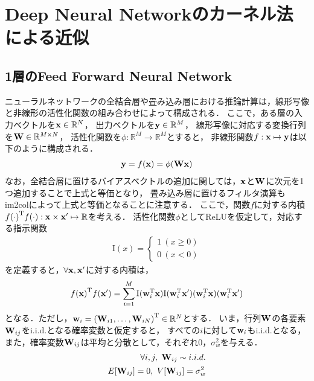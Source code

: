 \documentclass[11pt,a4j]{jarticle}
\begin{document}
  \section{Deep Neural Networkのカーネル法による近似}
    \subsection{1層のFeed Forward Neural Network}
      ニューラルネットワークの全結合層や畳み込み層における推論計算は，線形写像と非線形の活性化関数の組み合わせによって構成される．
      ここで，ある層の入力ベクトルを${\bf x} \in \mathbb{R}^{N}$，
      出力ベクトルを${\bf y} \in \mathbb{R}^{M}$，
      線形写像に対応する変換行列を${\bf W} \in \mathbb{R}^{M \times N}$，
      活性化関数を$\phi: \mathbb{R}^{M} \to \mathbb{R}^{M}$とすると，
      非線形関数$f:{\bf x} \mapsto {\bf y}$は以下のように構成される．
      \begin{align}
        {\bf y} = f({\bf x}) = \phi( {\bf W x} )
      \end{align}
      なお，全結合層に置けるバイアスベクトルの追加に関しては，$\bf x$と$\bf W$に次元を1つ追加することで上式と等価となり，
      畳み込み層に置けるフィルタ演算もim2colによって上式と等価となることに注意する．
      ここで，関数$f$に対する内積${f(\cdot)}^{\mathrm{T}}f(\cdot): {\bf x} \times {\bf x}' \mapsto \mathbb{R}$を考える．
      活性化関数$\phi$としてReLUを仮定して，対応する指示関数
      \begin{align}
        {\mathrm{I}}(x) = 
        \begin{cases}
          1 ~ (x \geq 0) \\
          0 ~ (x < 0)
        \end{cases}
      \end{align}
      を定義すると，$\forall {\bf x},{\bf x}'$に対する内積は，
      \begin{align}
        {f({\bf x})}^{\mathrm{T}} f({\bf x}') = \sum_{i=1}^{M} 
        {\mathrm{I}}( {\bf w}_{i}^{\mathrm{T}} {\bf x} ) {\mathrm{I}}( {\bf w}_{i}^{\mathrm{T}} {\bf x}' ) 
        ( {\bf w}_{i}^{\mathrm{T}} {\bf x} ) ( {\bf w}_{i}^{\mathrm{T}} {\bf x}' )
      \end{align}
      となる．ただし，${\bf w}_i = {( {\bf W}_{i1},\dots,{\bf W}_{iN} )}^{\mathrm{T}} \in \mathbb{R}^{N}$とする．
      いま，行列$\bf W$の各要素${\bf W}_{ij}$をi.i.d.となる確率変数と仮定すると，
      すべての$i$に対して${\bf w}_i$もi.i.d.となる，また，確率変数${\bf W}_{ij}$は平均と分散として，それぞれ$0$，$\sigma_w^2$を与える．
      \begin{align}
        \forall i,j, ~ {\bf W}_{ij} \sim i.i.d. \\
        E[{\bf W}_{ij}] = 0, ~ V[{\bf W}_{ij}] = \sigma_w^2
      \end{align}
\end{document}
